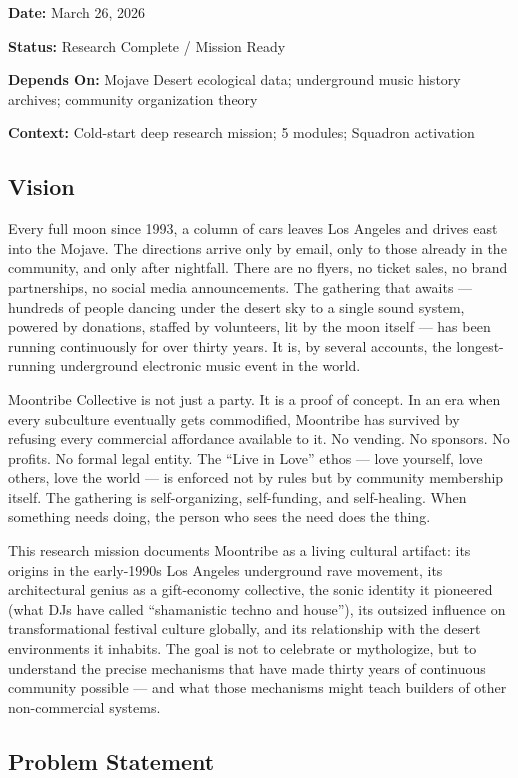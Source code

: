 \documentclass[11pt,letterpaper]{article}
\newcommand{\metafield}[2]{\textbf{\sffamily #1} #2\par}
\begin{document}
\metafield{Date:}{March 26, 2026}
\metafield{Status:}{Research Complete / Mission Ready}
\metafield{Depends On:}{Mojave Desert ecological data; underground music history archives; community organization theory}
\metafield{Context:}{Cold-start deep research mission; 5 modules; Squadron activation}

\subsection{Vision}

Every full moon since 1993, a column of cars leaves Los Angeles and drives east into the Mojave. The directions arrive only by email, only to those already in the community, and only after nightfall. There are no flyers, no ticket sales, no brand partnerships, no social media announcements. The gathering that awaits --- hundreds of people dancing under the desert sky to a single sound system, powered by donations, staffed by volunteers, lit by the moon itself --- has been running continuously for over thirty years. It is, by several accounts, the longest-running underground electronic music event in the world.

Moontribe Collective is not just a party. It is a proof of concept. In an era when every subculture eventually gets commodified, Moontribe has survived by refusing every commercial affordance available to it. No vending. No sponsors. No profits. No formal legal entity. The ``Live in Love'' ethos --- love yourself, love others, love the world --- is enforced not by rules but by community membership itself. The gathering is self-organizing, self-funding, and self-healing. When something needs doing, the person who sees the need does the thing.

This research mission documents Moontribe as a living cultural artifact: its origins in the early-1990s Los Angeles underground rave movement, its architectural genius as a gift-economy collective, the sonic identity it pioneered (what DJs have called ``shamanistic techno and house''), its outsized influence on transformational festival culture globally, and its relationship with the desert environments it inhabits. The goal is not to celebrate or mythologize, but to understand the precise mechanisms that have made thirty years of continuous community possible --- and what those mechanisms might teach builders of other non-commercial systems.

\subsection{Problem Statement}
\end{document}
